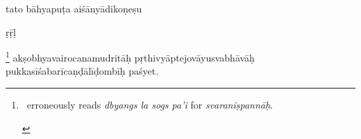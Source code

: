 \documentclass[naipra.tex]{subfiles}
\begin{document}
\begin{sanskrit}

\pstart
tato bāhyapuṭa aiśānyādikoṇeṣu \begin{mantra}\dsh ṛ\dsh ṝ\dsh ḷ\end{mantra}\dsh {}\footnote{\begin{english}
	\TIB\ erroneously reads \emph{dbyangs la sogs pa'i} for \emph{svaraniṣpannāḥ}. 
\end{english}} akṣobhyavairocanamudritāḥ pṛthivyāptejovāyusvabhāvāḥ pukkasīśabarīcaṇḍālīḍombīḥ paśyet. 
\pend



\end{sanskrit}
\end{document}
